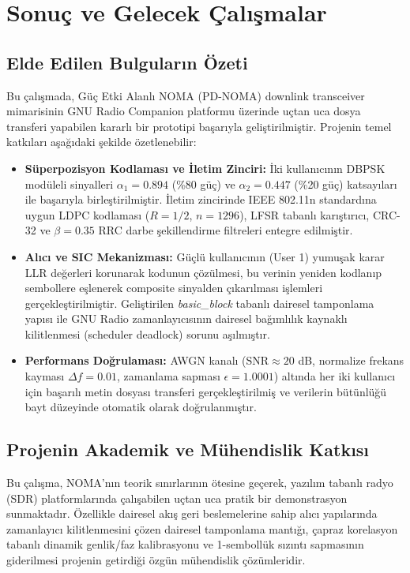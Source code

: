 \section{Sonuç ve Gelecek Çalışmalar}

\subsection{Elde Edilen Bulguların Özeti}
Bu çalışmada, Güç Etki Alanlı NOMA (PD-NOMA) downlink transceiver mimarisinin GNU Radio Companion platformu üzerinde uçtan uca dosya transferi yapabilen kararlı bir prototipi başarıyla geliştirilmiştir. Projenin temel katkıları aşağıdaki şekilde özetlenebilir:
\begin{itemize}
    \item \textbf{Süperpozisyon Kodlaması ve İletim Zinciri:} İki kullanıcının DBPSK modüleli sinyalleri $\alpha_1 = 0.894$ (\%80 güç) ve $\alpha_2 = 0.447$ (\%20 güç) katsayıları ile başarıyla birleştirilmiştir. İletim zincirinde IEEE 802.11n standardına uygun LDPC kodlaması ($R=1/2$, $n=1296$), LFSR tabanlı karıştırıcı, CRC-32 ve $\beta=0.35$ RRC darbe şekillendirme filtreleri entegre edilmiştir.
    \item \textbf{Alıcı ve SIC Mekanizması:} Güçlü kullanıcının (User 1) yumuşak karar LLR değerleri korunarak kodunun çözülmesi, bu verinin yeniden kodlanıp sembollere eşlenerek composite sinyalden çıkarılması işlemleri gerçekleştirilmiştir. Geliştirilen \textit{basic\_block} tabanlı dairesel tamponlama yapısı ile GNU Radio zamanlayıcısının dairesel bağımlılık kaynaklı kilitlenmesi (scheduler deadlock) sorunu aşılmıştır.
    \item \textbf{Performans Doğrulaması:} AWGN kanalı ($\text{SNR} \approx 20$ dB, normalize frekans kayması $\Delta f = 0.01$, zamanlama sapması $\epsilon = 1.0001$) altında her iki kullanıcı için başarılı metin dosyası transferi gerçekleştirilmiş ve verilerin bütünlüğü bayt düzeyinde otomatik olarak doğrulanmıştır.
\end{itemize}

\subsection{Projenin Akademik ve Mühendislik Katkısı}
Bu çalışma, NOMA'nın teorik sınırlarının ötesine geçerek, yazılım tabanlı radyo (SDR) platformlarında çalışabilen uçtan uca pratik bir demonstrasyon sunmaktadır. Özellikle dairesel akış geri beslemelerine sahip alıcı yapılarında zamanlayıcı kilitlenmesini çözen dairesel tamponlama mantığı, çapraz korelasyon tabanlı dinamik genlik/faz kalibrasyonu ve 1-sembollük sızıntı sapmasının giderilmesi projenin getirdiği özgün mühendislik çözümleridir.

